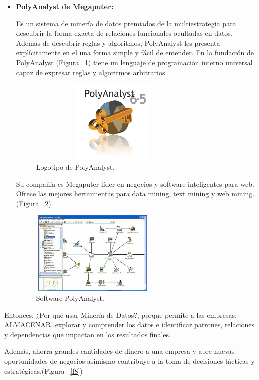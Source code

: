 \documentclass[10pt,journal]{IEEEtran}
\begin{document}
\vspace{5 mm}
\begin{itemize}
    \item \textbf{PolyAnalyst de Megaputer:}\par
    Es un sistema de minería de datos premiados de la multiestrategia para descubrir la forma exacta de relaciones funcionales ocultadas en datos. Además de descubrir reglas y algoritmos, PolyAnalyst les presenta explícitamente en el una forma simple y fácil de entender. En la fundación de PolyAnalyst (Figura ~\ref{f6}) tiene un lenguaje de programación interno universal capaz de expresar reglas y algoritmos arbitrarios.\par
\begin{figure}[H]
 \begin{center}
       \includegraphics[width=8cm, height=4cm]{figuras/7.PNG}
      \caption{Logotipo de PolyAnalyst.}
      \label{f6} 
      \end{center}
\end{figure}
    Su compañía es Megaputer líder en negocios y software inteligentes para web. Ofrece las mejores herramientas para data mining, text mining y web mining.(Figura ~\ref{f7}) 
\begin{figure}[H]
 \begin{center}
       \includegraphics[width=6cm, height=4cm]{figuras/6.PNG}
      \caption{Software PolyAnalyst.}
      \label{f7} 
      \end{center}
\end{figure}    
\end{itemize}
Entonces, ¿Por qué usar Minería de Datos?, porque permite a las empresas, ALMACENAR, explorar y comprender los datos e identificar patrones, relaciones y dependencias que impactan en los resultados finales.\par Además, ahorra grandes cantidades de dinero a una empresa y abre nuevas oportunidades de negocios asimismo contribuye a la toma de decisiones tácticas y estratégicas.(Figura ~\ref{f8})
\end{document}
